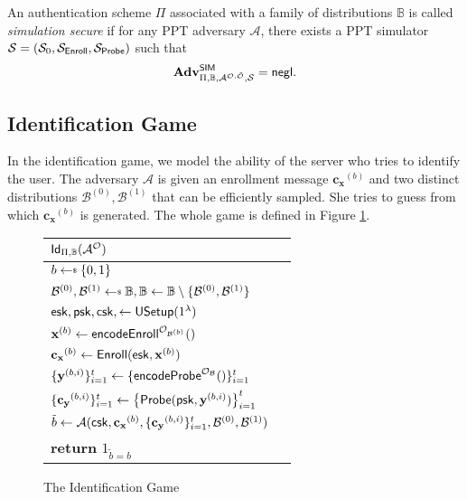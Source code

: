 An authentication scheme $\Pi$ associated with a family of distributions $\mathbb{B}$ is called \emph{simulation secure} if for any PPT adversary $\mathcal{A}$, there exists a PPT simulator $\mathcal{S} = (\mathcal{S}_0, \mathcal{S}_{\sf Enroll}, \mathcal{S}_{\sf Probe})$ such that
\[
	\mathbf{Adv}^{\sf SIM}_{\Pi, \mathbb{B}, \mathcal{A}^{\mathcal{O}, \tilde{\mathcal{O}}}, \mathcal{S}} = \mathsf{negl}.
\]


\subsection{Identification Game}
\label{sec:id_game}

In the identification game, we model the ability of the server who tries to identify the user. The adversary $\mathcal{A}$ is given an enrollment message $\mathbf{c_x}^{(b)}$ and two distinct distributions $\mathcal{B}^{(0)}, \mathcal{B}^{(1)}$ that can be efficiently sampled. She tries to guess from which $\mathbf{c_x}^{(b)}$ is generated. The whole game is defined in Figure \ref{fig:id_game}.

\begin{figure}[h]
	\begin{center}
	\begin{tabular}{l c}
		${\sf Id}_{\Pi, \mathbb{B}}(\mathcal{A}^\mathcal{O})$\\

			\hline

			$b \getsdollar \{0, 1\}$ \\

			$\mathcal{B}^{(0)}, \mathcal{B}^{(1)} \getsdollar \mathbb{B}, \mathbb{B} \gets \mathbb{B} \setminus \{ \mathcal{B}^{(0)}, \mathcal{B}^{(1)} \}$ \\

			${\sf esk}, {\sf psk}, {\sf csk}, \gets {\sf USetup}(1^\lambda)$ \\

			$\mathbf{x}^{(b)} \gets {\sf encodeEnroll}^{\mathcal{O}_{\mathcal{B}^{(b)}}}()$ \\

			$\mathbf{c_x}^{(b)} \gets {\sf Enroll}({\sf esk}, \mathbf{x}^{(b)})$ \\

			$\{\mathbf{y}^{(b,i)}\}_{i=1}^t \gets \{{\sf encodeProbe}^{\mathcal{O}_{\mathcal{B}}}() \}_{i=1}^t $ \\
			
			$\{ \mathbf{c_y}^{(b,i)} \}_{i=1}^t \gets \left\{ {\sf Probe}( {\sf psk}, \mathbf{y}^{(b,i)} ) \right \}_{i=1}^t$ \\

			$\tilde{b} \gets \mathcal{A} ( {\sf csk}, \mathbf{c_x}^{(b)}, \{ \mathbf{c_y}^{(b,i)} \}_{i=1}^t, \mathcal{B}^{(0)}, \mathcal{B}^{(1)} )$ \\

			\textbf{return} $1_{\tilde{b} = b}$
			
	\end{tabular}
	\end{center}
	\caption{The Identification Game}
	\label{fig:id_game}
\end{figure}


